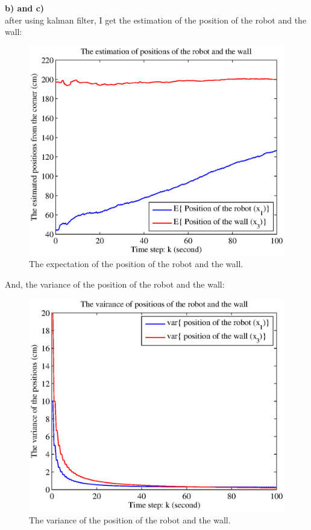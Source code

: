 \documentclass{article}
\begin{document}
\noindent \textbf{b) and c)}\\  
after using kalman filter, I get the estimation of the position of the robot and the wall:
\begin{figure}[H]
\begin{center}
\includegraphics[scale=0.6]{hw5_estX13.eps}
\caption{The expectation of the position of the robot and the wall.}
\end{center}
\end{figure}
And, the variance of the position of the robot and the wall:
\begin{figure}[H]
\begin{center}
\includegraphics[scale=0.7]{hw5_varX13.eps}
\caption{The variance of the position of the robot and the wall.}
\end{center}
\end{figure}
\end{document}
